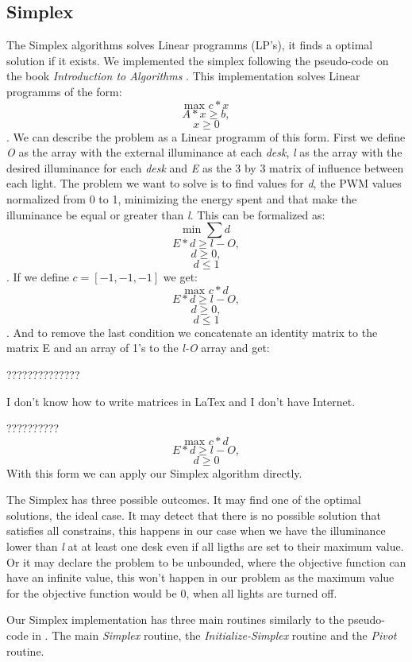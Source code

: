 \subsection{Simplex}
\label{sec:Simplex}

The Simplex algorithms solves Linear programms (LP's), it finds a optimal solution if it exists.
We implemented the simplex following the pseudo-code on the book \emph{Introduction to Algorithms} \cite{Cormen}.
This implementation solves Linear programms of the form:
$$ \text{max }c*x $$
$$    A*x \geq b, $$
$$    x \geq 0 $$.
We can describe the problem as a Linear programm of this form. First we define \emph{O} as the array with the external illuminance at each \emph{desk}, \emph{l} as the array with the desired illuminance for each \emph{desk} and \emph{E} as the  3 by 3 matrix of influence between each light.
The problem we want to solve is to find values for \emph{d}, the PWM values normalized from 0 to 1,  minimizing the energy spent and that make the illuminance be equal or greater than \emph{l}.
This can be formalized as:
$$ \text{min }\sum{d} $$
$$    E*d \geq l-O, $$
$$    d \geq 0, $$
$$    d \leq 1 $$.
If we define  $c = [-1, -1, -1]$ we get:
$$ \text{max }c*d $$
$$    E*d \geq l-O, $$
$$    d \geq 0, $$
$$    d \leq 1 $$.
And to remove the last condition we concatenate an identity matrix to the matrix E and an array of 1's to the \emph{l-O} array and get:

??????????????

I don't know how to write matrices in LaTex and I don't have Internet.

??????????
$$ \text{max }c*d $$
$$    E*d \geq l-O, $$
$$    d \geq 0 $$
With this form we can apply our Simplex algorithm directly.

The Simplex has three possible outcomes.
It may find one of the optimal solutions, the ideal case.
It may detect that there is no possible solution that satisfies all constrains, this happens in our case when we have the illuminance lower than \emph{l} at at least one desk even if all ligths are set to their maximum value.
Or it may declare the problem to be unbounded, where the objective function can have an infinite value, this won't happen in our problem as the maximum value for the objective function would be 0, when all lights are turned off.

Our Simplex implementation has three main routines similarly to the pseudo-code in \cite{Cormen}. The main \emph{Simplex} routine, the \emph{Initialize-Simplex} routine and the \emph{Pivot} routine.

